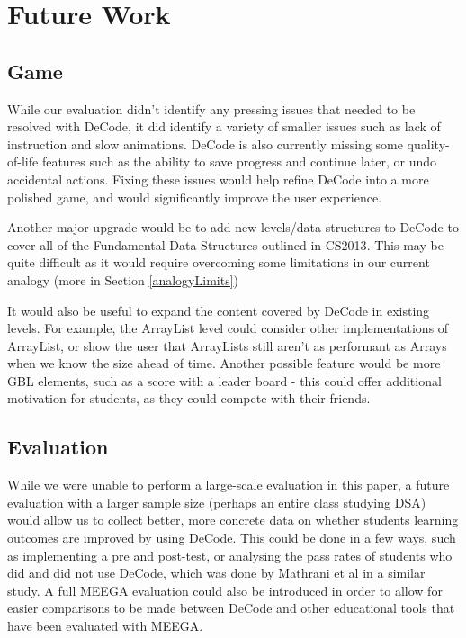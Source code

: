 \documentclass[11pt]{article}
\begin{document}
\section{Future Work}
\subsection{Game}
While our evaluation didn't identify any pressing issues that needed to be resolved with DeCode, it did identify a variety of smaller issues such as lack of instruction and slow animations. DeCode is also currently missing some quality-of-life features such as the ability to save progress and continue later, or undo accidental actions. Fixing these issues would help refine DeCode into a more polished game, and would significantly improve the user experience. \par
Another major upgrade would be to add new levels/data structures to DeCode to cover all of the Fundamental Data Structures outlined in CS2013\cite{CS2013}. This may be quite difficult as it would require overcoming some limitations in our current analogy (more in Section \ref{analogyLimits})\par
It would also be useful to expand the content covered by DeCode in existing levels. For example, the ArrayList level could consider other implementations of ArrayList, or show the user that ArrayLists still aren't as performant as Arrays when we know the size ahead of time. Another possible feature would be more GBL elements, such as a score with a leader board - this could offer additional motivation for students, as they could compete with their friends.
\subsection{Evaluation}
While we were unable to perform a large-scale evaluation in this paper, a future evaluation with a larger sample size (perhaps an entire class studying DSA) would allow us to collect better, more concrete data on whether students learning outcomes are improved by using DeCode. This could be done in a few ways, such as implementing a pre and post-test, or analysing the pass rates of students who did and did not use DeCode, which was done by Mathrani et al\cite{mathrani} in a similar study. A full MEEGA\cite{Rafael} evaluation could also be introduced in order to allow for easier comparisons to be made between DeCode and other educational tools that have been evaluated with MEEGA.
\end{document}
